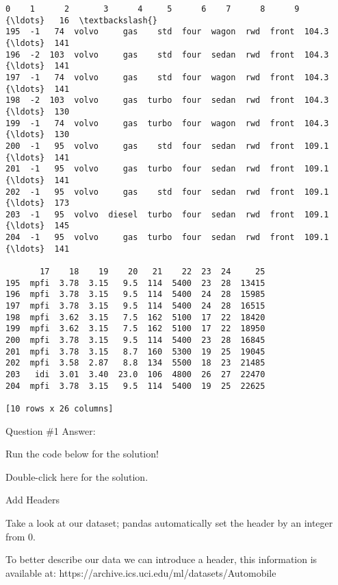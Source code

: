 \documentclass[11pt]{article}
\newcommand{\prompt}[4]{
        \llap{{\color{#2}[#3]: #4}}\vspace{-1.25em}
    }
\begin{document}
            \begin{tcolorbox}[breakable, boxrule=.5pt, size=fbox, pad at break*=1mm, opacityfill=0]
\prompt{Out}{outcolor}{5}{\hspace{3.5pt}}
\begin{Verbatim}[commandchars=\\\{\}]
     0    1      2       3      4     5      6    7      8      9   {\ldots}   16  \textbackslash{}
195  -1   74  volvo     gas    std  four  wagon  rwd  front  104.3  {\ldots}  141
196  -2  103  volvo     gas    std  four  sedan  rwd  front  104.3  {\ldots}  141
197  -1   74  volvo     gas    std  four  wagon  rwd  front  104.3  {\ldots}  141
198  -2  103  volvo     gas  turbo  four  sedan  rwd  front  104.3  {\ldots}  130
199  -1   74  volvo     gas  turbo  four  wagon  rwd  front  104.3  {\ldots}  130
200  -1   95  volvo     gas    std  four  sedan  rwd  front  109.1  {\ldots}  141
201  -1   95  volvo     gas  turbo  four  sedan  rwd  front  109.1  {\ldots}  141
202  -1   95  volvo     gas    std  four  sedan  rwd  front  109.1  {\ldots}  173
203  -1   95  volvo  diesel  turbo  four  sedan  rwd  front  109.1  {\ldots}  145
204  -1   95  volvo     gas  turbo  four  sedan  rwd  front  109.1  {\ldots}  141

       17    18    19    20   21    22  23  24     25
195  mpfi  3.78  3.15   9.5  114  5400  23  28  13415
196  mpfi  3.78  3.15   9.5  114  5400  24  28  15985
197  mpfi  3.78  3.15   9.5  114  5400  24  28  16515
198  mpfi  3.62  3.15   7.5  162  5100  17  22  18420
199  mpfi  3.62  3.15   7.5  162  5100  17  22  18950
200  mpfi  3.78  3.15   9.5  114  5400  23  28  16845
201  mpfi  3.78  3.15   8.7  160  5300  19  25  19045
202  mpfi  3.58  2.87   8.8  134  5500  18  23  21485
203   idi  3.01  3.40  23.0  106  4800  26  27  22470
204  mpfi  3.78  3.15   9.5  114  5400  19  25  22625

[10 rows x 26 columns]
\end{Verbatim}
\end{tcolorbox}
        
    Question \#1 Answer:

Run the code below for the solution!

    Double-click here for the solution.

    Add Headers

Take a look at our dataset; pandas automatically set the header by an
integer from 0.

To better describe our data we can introduce a header, this information
is available at: https://archive.ics.uci.edu/ml/datasets/Automobile
\end{document}
